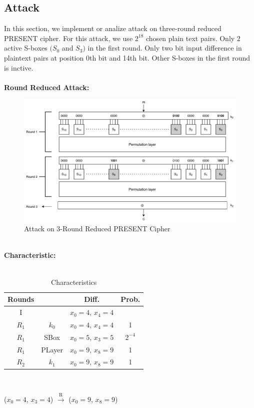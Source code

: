 \documentclass[journal=tosc,preprint]{iacrtrans}
\begin{document}
\subsection{Attack}
In this section, we implement or analize attack on three-round reduced PRESENT cipher.
For this attack, we use $2^{18}$ chosen plain text pairs. Only 2 active S-boxes $(S_0 $ and $S_3)$ in the first round. Only two bit input difference in plaintext pairs at position 0th bit and 14th bit. Other S-boxes in the first round is inctive. \\\\
\textbf{Round Reduced Attack:}\\
\begin{figure}[h!]
	\centering
	\includegraphics[width=0.9\linewidth, height=0.3\textheight]{DC1}
	\caption{Attack on 3-Round Reduced PRESENT Cipher}
	\label{fig:dc1}
\end{figure}\\
\textbf{Characteristic:}\\\\
\begin{table}[h!]
	\caption{Characteristics}
	\centering
	\begin{tabular}{ |c||c|c|c| }
		\hline
		Rounds & & Diff. & Prob. \\ \hline \hline
		I& & $x_0 = 4$, $x_4 = 4$ &  \\ 
		$R_1$& $k_0$ & $x_0 = 4$, $x_4 = 4$ & 1 \\
		$R_1$& SBox & $x_0 = 5$, $x_{3} = 5$ & $2^{-4}$ \\
		$R_1$& PLayer & $x_0 = 9$, $x_{8} = 9$ & 1 \\
		$R_2$& $k_1$ & $x_0 = 9$, $x_{8} = 9$ & 1 \\ \hline
	\end{tabular}\\
\end{table}
	($x_0 = 4$, $x_3 = 4$) $\xrightarrow[]{\text{R}}$ ($x_0 = 9$, $x_8 = 9$)\\\\
\end{document}
